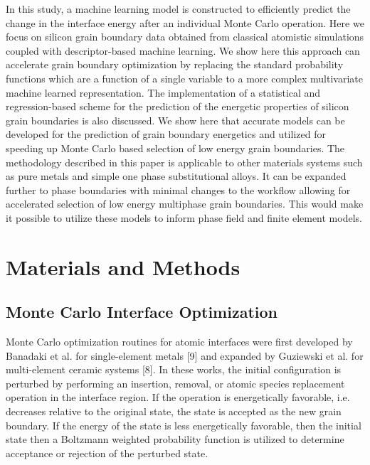 \documentclass[aip,reprint,longbibliography,amsmath,amssymb,twocolumn,superscriptaddress]{revtex4-1}
\begin{document}
In this study, a machine learning model is constructed to efficiently predict the change in the interface energy after an individual Monte Carlo operation. 
%
Here we focus on silicon grain boundary data obtained from classical atomistic simulations coupled with descriptor-based machine learning. 
%
We show here this approach can accelerate grain boundary optimization  by replacing the standard probability functions which are a function of a single variable to a more complex multivariate machine learned representation. 
%
The implementation of a statistical and regression-based scheme for the prediction of the energetic properties of silicon grain boundaries is also discussed. 
%
We show here that accurate models can be developed for the prediction of grain boundary energetics and utilized for speeding up Monte Carlo based selection of low energy grain boundaries.  
%
The methodology described in this paper is applicable to other materials systems such as pure metals and simple one phase substitutional alloys. 
%
It can be expanded further to phase boundaries with minimal changes to the workflow allowing for accelerated selection of low energy multiphase grain boundaries. This would make it possible to utilize these models to inform phase field and finite element models. 

\section{Materials and Methods}
\subsection{Monte Carlo Interface Optimization}
Monte Carlo optimization routines for atomic interfaces were first developed by Banadaki et al. for single-element metals [9] and expanded by Guziewski et al. for multi-element ceramic systems [8].  
%
In these works, the initial configuration is perturbed by performing an insertion, removal, or atomic species replacement operation in the interface region. 
%
If the operation is energetically favorable, i.e. decreases relative to the original state, the state is accepted as the new grain boundary. 
%
If the energy of the state is less energetically favorable, then the initial state then a Boltzmann weighted probability function is utilized to determine acceptance or rejection of the perturbed state. 
\end{document}
